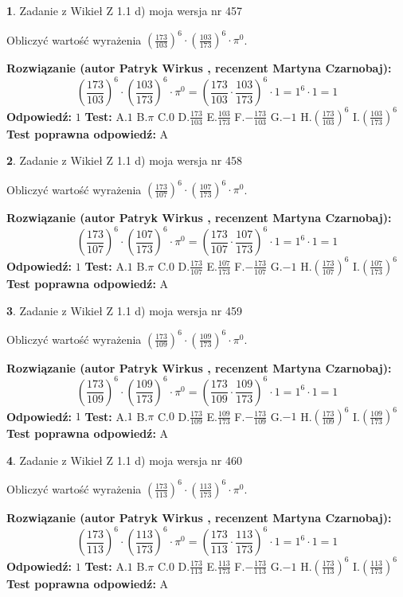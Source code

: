 \documentclass[12pt, a4paper]{article}
\theoremstyle{definition} %
\newtheorem{zad}{}
\newcommand{\zadStart}[1]{\begin{zad}#1\newline}
\newcommand{\zadStop}{\end{zad}}
\newcommand{\rozwStart}[2]{\noindent \textbf{Rozwiązanie (autor #1 , recenzent #2): }\newline}
\newcommand{\rozwStop}{\newline}
\newcommand{\odpStart}{\noindent \textbf{Odpowiedź:}\newline}
\newcommand{\odpStop}{\newline}
\newcommand{\testStart}{\noindent \textbf{Test:}\newline}
\newcommand{\testStop}{\newline}
\newcommand{\kluczStart}{\noindent \textbf{Test poprawna odpowiedź:}\newline}
\newcommand{\kluczStop}{\newline}
\begin{document}
\zadStart{Zadanie z Wikieł Z 1.1 d) moja wersja nr 457}

Obliczyć wartość wyrażenia $(\frac{173}{103})^{6} \cdot (\frac{103}{173})^{6} \cdot \pi^{0}$.
\zadStop
\rozwStart{Patryk Wirkus}{Martyna Czarnobaj}
$$(\frac{173}{103})^{6} \cdot (\frac{103}{173})^{6} \cdot \pi^{0} = (\frac{173}{103} \cdot \frac{103}{173})^{6} \cdot 1 = 1^{6} \cdot 1 = 1$$
\rozwStop
\odpStart
$1$
\odpStop
\testStart
A.$1$ B.$\pi$ C.$0$ D.$\frac{173}{103}$ E.$\frac{103}{173}$
F.$-\frac{173}{103}$ G.$-1$
H.$(\frac{173}{103})^{6}$
I.$(\frac{103}{173})^{6}$
\testStop
\kluczStart
A
\kluczStop



\zadStart{Zadanie z Wikieł Z 1.1 d) moja wersja nr 458}

Obliczyć wartość wyrażenia $(\frac{173}{107})^{6} \cdot (\frac{107}{173})^{6} \cdot \pi^{0}$.
\zadStop
\rozwStart{Patryk Wirkus}{Martyna Czarnobaj}
$$(\frac{173}{107})^{6} \cdot (\frac{107}{173})^{6} \cdot \pi^{0} = (\frac{173}{107} \cdot \frac{107}{173})^{6} \cdot 1 = 1^{6} \cdot 1 = 1$$
\rozwStop
\odpStart
$1$
\odpStop
\testStart
A.$1$ B.$\pi$ C.$0$ D.$\frac{173}{107}$ E.$\frac{107}{173}$
F.$-\frac{173}{107}$ G.$-1$
H.$(\frac{173}{107})^{6}$
I.$(\frac{107}{173})^{6}$
\testStop
\kluczStart
A
\kluczStop



\zadStart{Zadanie z Wikieł Z 1.1 d) moja wersja nr 459}

Obliczyć wartość wyrażenia $(\frac{173}{109})^{6} \cdot (\frac{109}{173})^{6} \cdot \pi^{0}$.
\zadStop
\rozwStart{Patryk Wirkus}{Martyna Czarnobaj}
$$(\frac{173}{109})^{6} \cdot (\frac{109}{173})^{6} \cdot \pi^{0} = (\frac{173}{109} \cdot \frac{109}{173})^{6} \cdot 1 = 1^{6} \cdot 1 = 1$$
\rozwStop
\odpStart
$1$
\odpStop
\testStart
A.$1$ B.$\pi$ C.$0$ D.$\frac{173}{109}$ E.$\frac{109}{173}$
F.$-\frac{173}{109}$ G.$-1$
H.$(\frac{173}{109})^{6}$
I.$(\frac{109}{173})^{6}$
\testStop
\kluczStart
A
\kluczStop



\zadStart{Zadanie z Wikieł Z 1.1 d) moja wersja nr 460}

Obliczyć wartość wyrażenia $(\frac{173}{113})^{6} \cdot (\frac{113}{173})^{6} \cdot \pi^{0}$.
\zadStop
\rozwStart{Patryk Wirkus}{Martyna Czarnobaj}
$$(\frac{173}{113})^{6} \cdot (\frac{113}{173})^{6} \cdot \pi^{0} = (\frac{173}{113} \cdot \frac{113}{173})^{6} \cdot 1 = 1^{6} \cdot 1 = 1$$
\rozwStop
\odpStart
$1$
\odpStop
\testStart
A.$1$ B.$\pi$ C.$0$ D.$\frac{173}{113}$ E.$\frac{113}{173}$
F.$-\frac{173}{113}$ G.$-1$
H.$(\frac{173}{113})^{6}$
I.$(\frac{113}{173})^{6}$
\testStop
\kluczStart
A
\kluczStop
\end{document}
